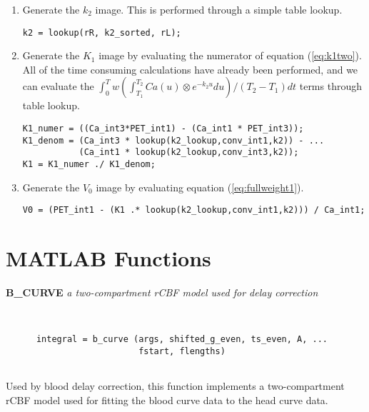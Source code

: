 \begin{enumerate}
\begin{verbatim}
[rR,sort_order] = sort (rR);
k2_sorted = k2_lookup (sort_order);
\end{verbatim}

\item Generate the $k_2$ image.  This is performed through a simple
table lookup.
\begin{verbatim}
k2 = lookup(rR, k2_sorted, rL);
\end{verbatim}

\item Generate the $K_1$ image by evaluating the numerator of
equation (\ref{eq:k1two}).  All of the time consuming calculations
have already been performed, and we can evaluate the $\int_{0}^{T} w
(\int_{T_1}^{T_2} Ca(u) \otimes e^{-k_{2}u} du)/(T_2 - T_1) dt$ terms
through table lookup.
\begin{verbatim}
K1_numer = ((Ca_int3*PET_int1) - (Ca_int1 * PET_int3));
K1_denom = (Ca_int3 * lookup(k2_lookup,conv_int1,k2)) - ...
           (Ca_int1 * lookup(k2_lookup,conv_int3,k2));
K1 = K1_numer ./ K1_denom;
\end{verbatim}

\item Generate the $V_0$ image by evaluating equation
(\ref{eq:fullweight1}).
\begin{verbatim}
V0 = (PET_int1 - (K1 .* lookup(k2_lookup,conv_int1,k2))) / Ca_int1;
\end{verbatim}

\end{enumerate}






\newpage
\section{MATLAB Functions}

{\large\bf B\_CURVE} {\em a two-compartment rCBF model used for delay
correction}
\begin{verbatim}


      integral = b_curve (args, shifted_g_even, ts_even, A, ... 
                          fstart, flengths)


\end{verbatim}

  Used by blood delay correction, this function implements a
  two-compartment rCBF model used for fitting the blood
  curve data to the head curve data.
\newpage

